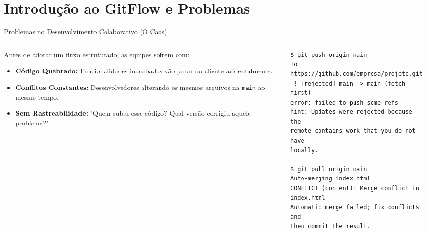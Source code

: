\documentclass[aspectratio=169]{beamer}
\begin{document}

\section{Introdução ao GitFlow e Problemas}

\begin{frame}[fragile]{Problemas no Desenvolvimento Colaborativo (O Caos)}
    \begin{columns}
        \begin{column}{0.5\textwidth}
            Antes de adotar um fluxo estruturado, as equipes sofrem com:
            \vspace{0.2cm}
            \begin{itemize}
                \item \textbf{Código Quebrado:} Funcionalidades inacabadas vão parar no cliente acidentalmente.
                \item \textbf{Conflitos Constantes:} Desenvolvedores alterando os mesmos arquivos na \texttt{main} ao mesmo tempo.
                \item \textbf{Sem Rastreabilidade:} "Quem subiu esse código? Qual versão corrigiu aquele problema?"
            \end{itemize}
        \end{column}
        \begin{column}{0.5\textwidth}
            \begin{onlyenv}
\begin{lstlisting}[basicstyle=\ttfamily\tiny]
$ git push origin main
To https://github.com/empresa/projeto.git
 ! [rejected] main -> main (fetch first)
error: failed to push some refs
hint: Updates were rejected because the
remote contains work that you do not have
locally.

$ git pull origin main
Auto-merging index.html
CONFLICT (content): Merge conflict in 
index.html
Automatic merge failed; fix conflicts and 
then commit the result.
\end{lstlisting}
            \end{onlyenv}
        \end{column}
    \end{columns}
\end{frame}
\end{document}

